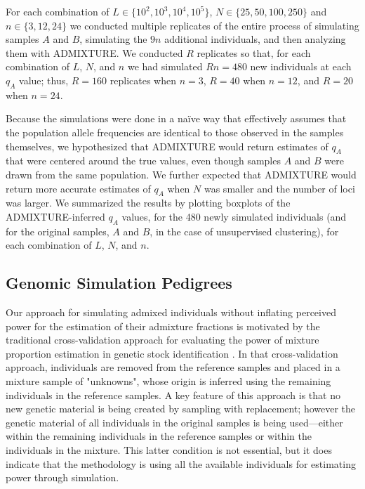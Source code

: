 For each combination of $L \in \{10^2, 10^3, 10^4, 10^5\}$,
$N \in \{25, 50, 100, 250\}$ and $n\in\{3,12,24\}$ we conducted multiple replicates
of the entire process of
simulating samples $A$ and $B$, simulating the $9n$ additional individuals, and
then analyzing them with ADMIXTURE.  We conducted $R$ replicates so that,
for each combination of $L$, $N$, and $n$ we had simulated $Rn=480$ new individuals
at each $q_A$ value; thus, $R=160$ replicates when $n = 3$, $R=40$ when $n=12$, and
$R=20$ when $n=24$.

Because the simulations were done in a na\"{i}ve way that effectively assumes that the population
allele frequencies are identical to those observed in the samples themselves, we hypothesized that ADMIXTURE would return estimates of $q_A$ that were
centered around the true values, even though samples $A$ and $B$ were drawn from the same
population.
We further expected that ADMIXTURE would return more accurate estimates of
$q_A$ when $N$ was smaller and the number of loci was larger.
We summarized the results by plotting boxplots of the ADMIXTURE-inferred $q_A$ values,
 for the 480 newly simulated individuals (and for the original samples, $A$ and $B$, in the
 case of unsupervised clustering),
for each combination of $L$, $N$, and $n$.




\subsection*{Genomic Simulation Pedigrees}

Our approach for simulating admixed individuals without inflating perceived power for
the estimation of their admixture fractions is motivated by the traditional cross-validation
approach for evaluating the power of mixture proportion
estimation in genetic stock identification \citep{Moran&AndersonRubias}.
In that cross-validation approach, individuals are removed from the reference
samples and placed in a mixture sample of "unknowns", whose origin
is inferred using the remaining individuals in the reference samples.  A key
feature of this approach is that no new genetic material is being created by
sampling with replacement; however the genetic material of all individuals
in the original samples is being used---either within the remaining individuals in the
reference samples or within the individuals in the mixture. This latter condition
is not essential, but it does indicate that the methodology is using all the
available individuals for estimating power through simulation.

